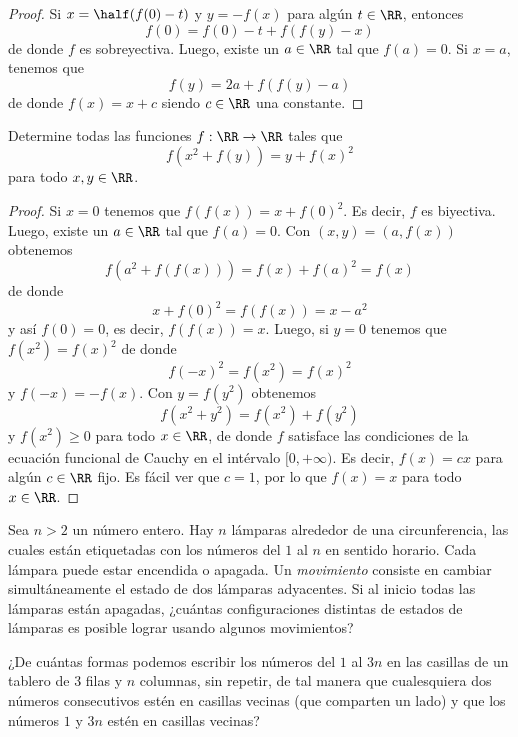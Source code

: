 \begin{proof}
  Si $x=\half(f(0)-t)$ y $y=-f(x)$ para algún $t\in\RR$, entonces
  \[f(0)=f(0)-t+f(f(y)-x)\]
  de donde $f$ es sobreyectiva. Luego, existe un $a\in\RR$ tal que $f(a)=0$. Si
  $x=a$, tenemos que
  \[f(y)=2a+f(f(y)-a)\]
  de donde $f(x)=x+c$ siendo $c\in\RR$ una constante.
\end{proof}

\begin{probEG}
  Determine todas las funciones $f:\RR\to\RR$ tales que
  \[f(x^2+f(y))=y+f(x)^2\]
  para todo $x,y\in\RR$.
\end{probEG}

\begin{proof}
  Si $x=0$ tenemos que $f(f(x))=x+f(0)^2$. Es decir, $f$ es biyectiva. Luego,
  existe un $a\in\RR$ tal que $f(a)=0$. Con $(x,y)=(a,f(x))$ obtenemos
  \[f(a^2+f(f(x)))=f(x)+f(a)^2=f(x)\]
  de donde
  \[x+f(0)^2=f(f(x))=x-a^2\]
  y así $f(0)=0$, es decir, $f(f(x))=x$. Luego, si $y=0$ tenemos que
  $f(x^2)=f(x)^2$ de donde
  \[f(-x)^2=f(x^2)=f(x)^2\]
  y $f(-x)=-f(x)$. Con $y=f(y^2)$ obtenemos
  \[f(x^2+y^2)=f(x^2)+f(y^2)\]
  y $f(x^2)\ge 0$ para todo $x\in\RR$, de donde $f$ satisface las condiciones de
  la ecuación funcional de Cauchy en el intérvalo $[0,+\infty)$. Es decir,
  $f(x)=cx$ para algún $c\in\RR$ fijo. Es fácil ver que $c=1$, por lo que
  $f(x)=x$ para todo $x\in\RR$.
\end{proof}


\begin{probEG}
  Sea $n>2$ un número entero. Hay $n$ lámparas alrededor de una circunferencia,
  las cuales están etiquetadas con los números del $1$ al $n$ en sentido
  horario. Cada lámpara puede estar encendida o apagada. Un \emph{movimiento}
  consiste en cambiar simultáneamente el estado de dos lámparas adyacentes. Si
  al inicio todas las lámparas están apagadas, ¿cuántas configuraciones
  distintas de estados de lámparas es posible lograr usando algunos movimientos?
\end{probEG}

\begin{probEG}
  ¿De cuántas formas podemos escribir los números del $1$ al $3n$ en las
  casillas de un tablero de $3$ filas y $n$ columnas, sin repetir, de tal manera
  que cualesquiera dos números consecutivos estén en casillas vecinas (que
  comparten un lado) y que los números $1$ y $3n$ estén en casillas vecinas?
\end{probEG}

